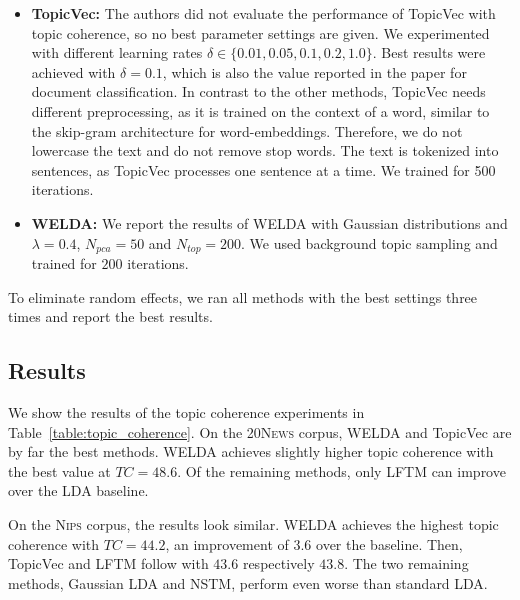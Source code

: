 \documentclass[
        a4paper,
        titlepage,
        twoside,
        parskip,
        numbers=noenddot
        ]{scrbook}
\theoremstyle{break}
\begin{document}
\begin{itemize}
  \item
    \textbf{TopicVec:}
    The authors did not evaluate the performance of TopicVec with topic coherence, so no best parameter settings are given.
    We experimented with different learning rates $\delta \in \{ 0.01, 0.05, 0.1, 0.2, 1.0 \}$.
    Best results were achieved with $\delta = 0.1$, which is also the value reported in the paper for document classification.
    In contrast to the other methods, TopicVec needs different preprocessing, as it is trained on the context of a word, similar to the skip-gram architecture for word-embeddings.
    Therefore, we do not lowercase the text and do not remove stop words.
    The text is tokenized into sentences, as TopicVec processes one sentence at a time.
    We trained for 500 iterations.
  \item
    \textbf{WELDA:}
    We report the results of WELDA with Gaussian distributions and $\lambda = 0.4$, $N_{pca} = 50$ and $N_{top} = 200$.
    We used background topic sampling and trained for $200$ iterations.
\end{itemize}

To eliminate random effects, we ran all methods with the best settings three times and report the best results.

\subsection{Results}
We show the results of the topic coherence experiments in Table~\ref{table:topic_coherence}.
On the \textsc{20News} corpus, WELDA and TopicVec are by far the best methods.
WELDA achieves slightly higher topic coherence with the best value at $TC = 48.6$.
Of the remaining methods, only LFTM can improve over the LDA baseline.

On the \textsc{Nips} corpus, the results look similar.
WELDA achieves the highest topic coherence with $TC = 44.2$, an improvement of $3.6$ over the baseline.
Then, TopicVec and LFTM follow with $43.6$ respectively $43.8$.
The two remaining methods, Gaussian LDA and NSTM, perform even worse than standard LDA.
\end{document}
